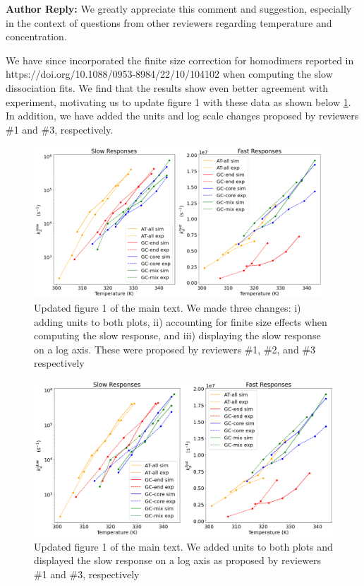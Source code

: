 \documentclass[11pt,a4paper]{letter} %
\begin{document}
\textbf{Author Reply:}   We greatly appreciate this comment and suggestion, especially in the context of questions from other reviewers regarding temperature and concentration. 

We have since incorporated the finite size correction for homodimers reported in  https://doi.org/10.1088/0953-8984/22/10/104102 \citep{Ouldridge2010ExtractingSimulations} when computing the slow dissociation fits. We find that the results show even better agreement with experiment, motivating us to update figure 1 with these data as shown below \ref{fig:conc_correction}. In addition, we have added the units and log scale changes proposed by reviewers \#1 and \#3, respectively.

\begin{figure}[ht!]
	\begin{center}
        \includegraphics[width=\textwidth]{cover_letter/revision_figures/both_response_log_4K_shift.png}
        \caption{Updated figure 1 of the main text. We made three changes: i) adding units to both plots, ii) accounting for finite size effects when computing the slow response, and iii) displaying the slow response on a log axis. These were proposed by reviewers \#1, \#2, and \#3 respectively}
        \label{fig:conc_correction}
	\end{center}
\end{figure}

\begin{figure}[ht!]
	\begin{center}
        \includegraphics[width=\textwidth]{cover_letter/revision_figures/both_response_log_no_correction_4K_shift.png}
        \caption{Updated figure 1 of the main text. We added units to both plots and displayed the slow response on a log axis as proposed by reviewers \#1 and \#3, respectively}
        \label{fig:conc_no_correction}
	\end{center}
\end{figure}
\end{document}
